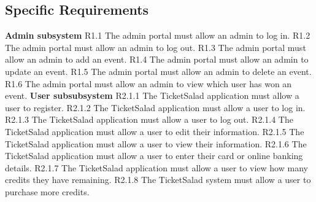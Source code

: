 \documentclass[11pt]{article}
\begin{document}
	\subsection{Specific Requirements}
	\textbf{Admin subsystem}
	\newline
	R1.1 The admin portal must allow an admin to log in.
	\newline
	R1.2 The admin portal must allow an admin to log out.
	\newline
	R1.3 The admin portal must allow an admin to add an event.
	\newline
	R1.4 The admin portal must allow an admin to update an event.
	\newline
	R1.5 The admin portal must allow an admin to delete an event.
	\newline
	R1.6 The admin portal must allow an admin to view which user has won an event.
	\newline
	\newline
	\textbf{User subsubsystem}
	\newline
	R2.1.1 The TicketSalad application must allow a user to register.
	\newline
	R2.1.2 The TicketSalad application must allow a user to log in.
	\newline
	R2.1.3 The TicketSalad application must allow a user to log out.
	\newline
	R2.1.4 The TicketSalad application must allow a user to edit their information.
	\newline
	R2.1.5 The TicketSalad application must allow a user to view their information.
	\newline
	R2.1.6 The TicketSalad application must allow a user to enter their card or online banking details.
	\newline 
	R2.1.7 The TicketSalad application must allow a user to view how many credits they have remaining.
	\newline
	R2.1.8 The TicketSalad system must allow a user to purchase more credits.
	\newline
	\newline
	
\end{document}
